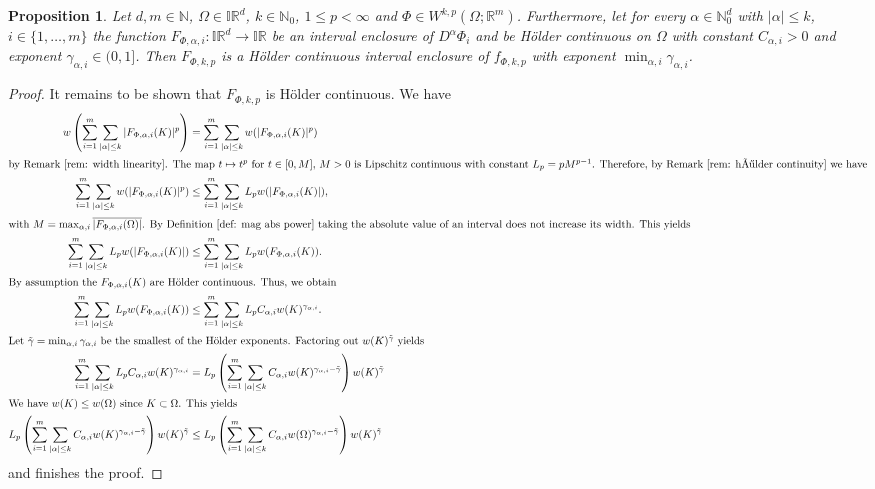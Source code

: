 \documentclass[a4paper, 11pt]{article}
\newtheorem{proposition}[theorem]{Proposition}
\begin{document}
	\begin{proposition}\label{prop: hölder lebesgue sobolev interval enclosure}
		Let $d,m\in \mathbb{N}$, $\Omega \in \mathbb{IR}^d$, $k\in \mathbb{N}_0$, $1\leq p < \infty$ and $\Phi \in W^{k,p}(\Omega;\mathbb{R}^m)$. Furthermore, let for every $\alpha \in \mathbb{N}^d_0$ with $|\alpha| \leq k$, $i\in\{1,\dotsc, m\}$ the function $F_{\Phi,\alpha,i}: \mathbb{IR}^d \to \mathbb{IR}$ be an interval enclosure of $D^\alpha\Phi_i$ and be Hölder continuous on $\Omega$ with constant $C_{\alpha, i}> 0$ and exponent $\gamma_{\alpha, i}\in(0,1]$. Then $F_{\Phi,k,p}$ is a Hölder continuous interval enclosure of $f_{\Phi,k,p}$ with exponent $\min_{\alpha, i} \gamma_{\alpha, i}$.
	\end{proposition}
	\begin{proof}
		It remains to be shown that $F_{\Phi,k,p}$ is Hölder continuous. We have
		\begin{align*}
			w\left( \sum_{i=1}^m\sum_{|\alpha|\leq k} |F_{\Phi,\alpha, i}(K)|^p \right) &= \sum_{i=1}^m\sum_{|\alpha|\leq k}w( |F_{\Phi,\alpha, i}(K)|^p  ) \\
			\intertext{by Remark~\ref{rem: width linearity}. The map $t\mapsto t^p$ for $t\in[0,M]$, $M>0$ is Lipschitz continuous with constant $L_p = pM^{p-1}$. Therefore, by Remark~\ref{rem: hölder continuity} we have}
			\sum_{i=1}^m\sum_{|\alpha|\leq k}w( |F_{\Phi,\alpha, i}(K)|^p  ) &\leq \sum_{i=1}^m\sum_{|\alpha|\leq k} L_p w( |F_{\Phi,\alpha, i}(K)|  ), \\
			\intertext{with $M=\max_{\alpha,i}\overline{|F_{\Phi,\alpha, i}(\Omega)|}$. By Definition~\ref{def: mag abs power} taking the absolute value of an interval does not increase its width. This yields}
			\sum_{i=1}^m\sum_{|\alpha|\leq k} L_p w( |F_{\Phi,\alpha, i}(K)|  )
			& \leq
			\sum_{i=1}^m\sum_{|\alpha|\leq k} L_p w( F_{\Phi,\alpha, i}(K)  ). \\
			\intertext{By assumption the  $F_{\Phi,\alpha, i}(K)$ are Hölder continuous. Thus, we obtain}
			\sum_{i=1}^m\sum_{|\alpha|\leq k} L_p w( F_{\Phi,\alpha, i}(K) )
			& \leq
			\sum_{i=1}^m\sum_{|\alpha|\leq k} L_p C_{\alpha,i} w( K )^{\gamma_{\alpha,i}}. \\
			\intertext{Let $\tilde{\gamma} = \min_{\alpha,i} \gamma_{\alpha,i}$ be the smallest of the Hölder exponents. Factoring out $w(K)^{\tilde{\gamma}}$ yields}
			\sum_{i=1}^m\sum_{|\alpha|\leq k} L_p C_{\alpha,i} w( K )^{\gamma_{\alpha,i}}
			& =
			L_p \left(\sum_{i=1}^m\sum_{|\alpha|\leq k} C_{\alpha,i} w(K)^{\gamma_{\alpha, i} - \tilde{\gamma}}\right) w( K )^{\tilde{\gamma}} \\
			\intertext{We have $w(K) \leq w(\Omega)$ since $K\subset \Omega$. This yields}
			L_p \left(\sum_{i=1}^m\sum_{|\alpha|\leq k} C_{\alpha,i} w(K)^{\gamma_{\alpha, i} - \tilde{\gamma}}\right) w( K )^{\tilde{\gamma}}
			& \leq
			L_p \left(\sum_{i=1}^m\sum_{|\alpha|\leq k} C_{\alpha,i} w(\Omega)^{\gamma_{\alpha, i} - \tilde{\gamma}}\right) w( K )^{\tilde{\gamma}}
		\end{align*}
		and finishes the proof.
	\end{proof}
	
\end{document}
